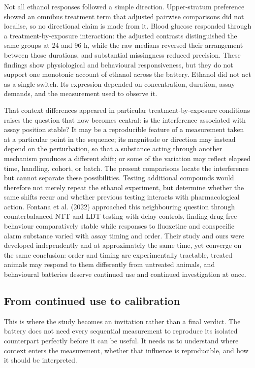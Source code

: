 \documentclass[12pt,a4paper]{article}
\begin{document}
Not all ethanol responses followed a simple direction. Upper-stratum preference showed an omnibus treatment term that adjusted pairwise comparisons did not localise, so no directional claim is made from it. Blood glucose responded through a treatment-by-exposure interaction: the adjusted contrasts distinguished the same groups at 24 and 96 h, while the raw medians reversed their arrangement between those durations, and substantial missingness reduced precision. These findings show physiological and behavioural responsiveness, but they do not support one monotonic account of ethanol across the battery. Ethanol did not act as a single switch. Its expression depended on concentration, duration, assay demands, and the measurement used to observe it.

That context differences appeared in particular treatment-by-exposure conditions raises the question that now becomes central: is the interference associated with assay position stable? It may be a reproducible feature of a measurement taken at a particular point in the sequence; its magnitude or direction may instead depend on the perturbation, so that a substance acting through another mechanism produces a different shift; or some of the variation may reflect elapsed time, handling, cohort, or batch. The present comparisons locate the interference but cannot separate these possibilities. Testing additional compounds would therefore not merely repeat the ethanol experiment, but determine whether the same shifts recur and whether previous testing interacts with pharmacological action. Fontana et al. (2022) approached this neighbouring question through counterbalanced NTT and LDT testing with delay controls, finding drug-free behaviour comparatively stable while responses to fluoxetine and conspecific alarm substance varied with assay timing and order. Their study and ours were developed independently and at approximately the same time, yet converge on the same conclusion: order and timing are experimentally tractable, treated animals may respond to them differently from untreated animals, and behavioural batteries deserve continued use and continued investigation at once.

\subsection{From continued use to calibration}

This is where the study becomes an invitation rather than a final verdict. The battery does not need every sequential measurement to reproduce its isolated counterpart perfectly before it can be useful. It needs us to understand where context enters the measurement, whether that influence is reproducible, and how it should be interpreted.
\end{document}
